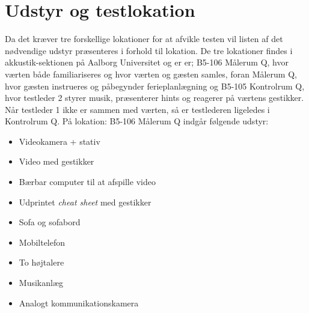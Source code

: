 \section{Udstyr og testlokation}
\label{UdstyrLokationSocialAccept}
%
Da det kræver tre forskellige lokationer for at afvikle testen vil listen af det nødvendige udstyr præsenteres i forhold til lokation. De tre lokationer findes i akkustik-sektionen på Aalborg Universitet og er er; B5-106 Målerum Q, hvor værten både familiariseres og hvor værten og gæsten samles, foran Målerum Q, hvor gæsten instrueres og påbegynder ferieplanlægning og B5-105 Kontrolrum Q, hvor testleder 2 styrer musik, præsenterer hints og reagerer på værtens gestikker. Når testleder 1 ikke er sammen med værten, så er testlederen ligeledes i Kontrolrum Q. \blankline
%
På lokation: B5-106 Målerum Q indgår følgende udstyr: 
\begin{itemize}
\item Videokamera + stativ
\item Video med gestikker
\item Bærbar computer til at afspille video
\item Udprintet \textit{cheat sheet} med gestikker
\item Sofa og sofabord
\item Mobiltelefon
\item To højtalere 
\item Musikanlæg
\item Analogt kommunikationskamera\blankline
\noindent
\end{itemize}
%
